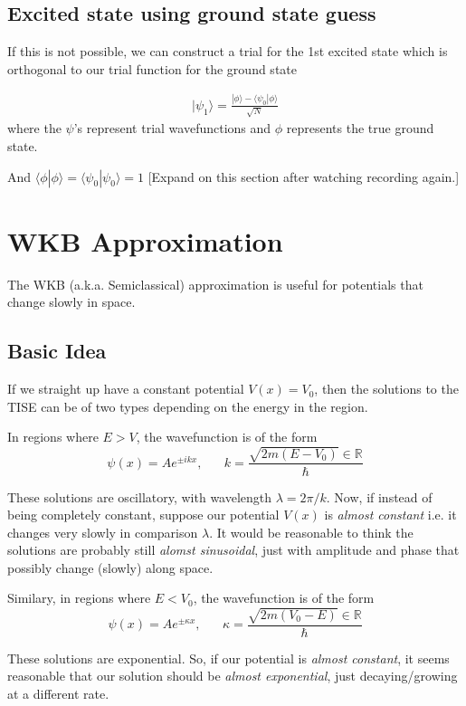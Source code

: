 \documentclass{article}
\newcommand{\ket}[1]{|#1 \rangle}
\newcommand{\inner}[2]{\langle #1 | #2 \rangle}
\newcommand{\R}{\mathbb{R}}
\begin{document}
\vskip 0.1cm
\subsection{Excited state using ground state guess}
If this is not possible, we can construct a trial for the 1st excited state which is orthogonal to our trial function for the ground state

\begin{align*}
  \ket{\psi_1} = \frac{\ket{\phi} - \inner{\psi_0}{\phi}}{\sqrt{N}}
\end{align*}
where the $\psi$'s represent trial wavefunctions and $\phi$ represents the true ground state.

And $\inner{\phi}{\phi} = \inner{\psi_0}{\psi_0} = 1$
[Expand on this section after watching recording again.]

\pagebreak

\section{WKB Approximation}

The WKB (a.k.a. Semiclassical) approximation is useful for potentials that change slowly in space. 

\vskip 1cm
\subsection{Basic Idea}
If we straight up have a constant potential $V(x) = V_0$, then the solutions to the TISE can be of two types depending on the energy in the region.

\vskip 0.5cm
In regions where $E > V$, the wavefunction is of the form 
\[ \psi(x) = Ae^{\pm ikx},\;\;\;\;\;\;k = \frac{\sqrt{2m(E-V_0)} \in \R }{\hbar}  \]

These solutions are oscillatory, with wavelength $\lambda = 2\pi/k$. Now, if instead of being completely constant, suppose our potential $V(x)$ is \emph{almost constant} i.e. it changes very slowly in comparison $\lambda$. It would be reasonable to think the solutions are probably still \emph{alomst sinusoidal}, just with amplitude and phase that possibly change (slowly) along space.

Similary, in regions where $E < V_0$, the wavefunction is of the form 
\[ \psi(x) = Ae^{\pm \kappa x},\;\;\;\;\;\;\kappa = \frac{\sqrt{2m(V_0 - E)} \in \R }{\hbar}  \]

These solutions are exponential. So, if our potential is \emph{almost constant}, it seems reasonable that our solution should be \emph{almost exponential}, just decaying/growing at a different rate. 
\end{document}
